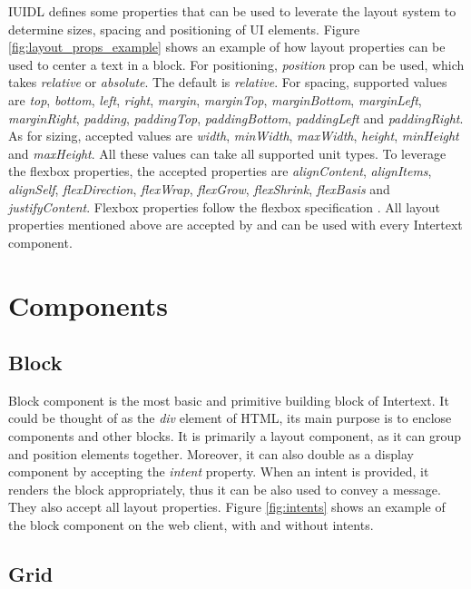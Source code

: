 IUIDL defines some properties that can be used to leverate the layout system to determine sizes, spacing and positioning of UI elements. Figure \ref{fig:layout_props_example} shows an example of how layout properties can be used to center a text in a block. For positioning, \textit{position} prop can be used, which takes \textit{relative} or \textit{absolute}. The default is \textit{relative}. For spacing, supported values are \textit{top}, \textit{bottom}, \textit{left}, \textit{right}, \textit{margin}, \textit{marginTop}, \textit{marginBottom}, \textit{marginLeft}, \textit{marginRight}, \textit{padding}, \textit{paddingTop}, \textit{paddingBottom}, \textit{paddingLeft} and \textit{paddingRight}. As for sizing, accepted values are \textit{width}, \textit{minWidth}, \textit{maxWidth}, \textit{height}, \textit{minHeight} and \textit{maxHeight}. All these values can take all supported unit types. To leverage the flexbox properties, the accepted properties are \textit{alignContent}, \textit{alignItems}, \textit{alignSelf}, \textit{flexDirection}, \textit{flexWrap}, \textit{flexGrow}, \textit{flexShrink}, \textit{flexBasis} and \textit{justifyContent}. Flexbox properties follow the flexbox specification \cite{FlexSpec1} \cite{FlexSpec2}. All layout properties mentioned above are accepted by and can be used with every Intertext component.

\section{Components}

\subsection{Block}

Block component is the most basic and primitive building block of Intertext. It could be thought of as the \textit{div} element of HTML, its main purpose is to enclose components and other blocks. It is primarily a layout component, as it can group and position elements together. Moreover, it can also double as a display component by accepting the \textit{intent} property. When an intent is provided, it renders the block appropriately, thus it can be also used to convey a message. They also accept all layout properties. Figure \ref{fig:intents} shows an example of the block component on the web client, with and without intents.

\subsection{Grid}

